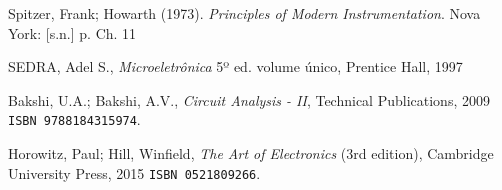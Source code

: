 \documentclass[letterpaper, 12pt]{article}
\begin{document}
\begin{thebibliography}{100}

Spitzer, Frank; Howarth (1973). \textit{Principles of Modern Instrumentation}. Nova York: [s.n.] p. Ch. 11

SEDRA, Adel S., \textit{Microeletrônica} 5º ed. volume único, Prentice Hall, 1997

Bakshi, U.A.; Bakshi, A.V., \textit{Circuit Analysis - II}, Technical Publications, 2009 \texttt{ISBN 9788184315974}.

Horowitz, Paul; Hill, Winfield, \textit{The Art of Electronics} (3rd edition), Cambridge University Press, 2015 \texttt{ISBN 0521809266}.

\end{thebibliography}
\end{document}
